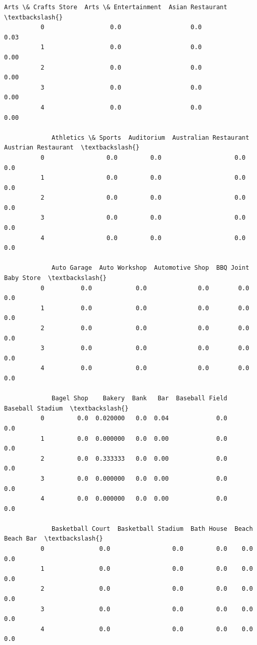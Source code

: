\documentclass[11pt]{article}
\begin{document}
\begin{Verbatim}[commandchars=\\\{\}]
             Arts \& Crafts Store  Arts \& Entertainment  Asian Restaurant  \textbackslash{}
          0                  0.0                   0.0              0.03   
          1                  0.0                   0.0              0.00   
          2                  0.0                   0.0              0.00   
          3                  0.0                   0.0              0.00   
          4                  0.0                   0.0              0.00   
          
             Athletics \& Sports  Auditorium  Australian Restaurant  Austrian Restaurant  \textbackslash{}
          0                 0.0         0.0                    0.0                  0.0   
          1                 0.0         0.0                    0.0                  0.0   
          2                 0.0         0.0                    0.0                  0.0   
          3                 0.0         0.0                    0.0                  0.0   
          4                 0.0         0.0                    0.0                  0.0   
          
             Auto Garage  Auto Workshop  Automotive Shop  BBQ Joint  Baby Store  \textbackslash{}
          0          0.0            0.0              0.0        0.0         0.0   
          1          0.0            0.0              0.0        0.0         0.0   
          2          0.0            0.0              0.0        0.0         0.0   
          3          0.0            0.0              0.0        0.0         0.0   
          4          0.0            0.0              0.0        0.0         0.0   
          
             Bagel Shop    Bakery  Bank   Bar  Baseball Field  Baseball Stadium  \textbackslash{}
          0         0.0  0.020000   0.0  0.04             0.0               0.0   
          1         0.0  0.000000   0.0  0.00             0.0               0.0   
          2         0.0  0.333333   0.0  0.00             0.0               0.0   
          3         0.0  0.000000   0.0  0.00             0.0               0.0   
          4         0.0  0.000000   0.0  0.00             0.0               0.0   
          
             Basketball Court  Basketball Stadium  Bath House  Beach  Beach Bar  \textbackslash{}
          0               0.0                 0.0         0.0    0.0        0.0   
          1               0.0                 0.0         0.0    0.0        0.0   
          2               0.0                 0.0         0.0    0.0        0.0   
          3               0.0                 0.0         0.0    0.0        0.0   
          4               0.0                 0.0         0.0    0.0        0.0   
          

\end{Verbatim}
\end{document}
